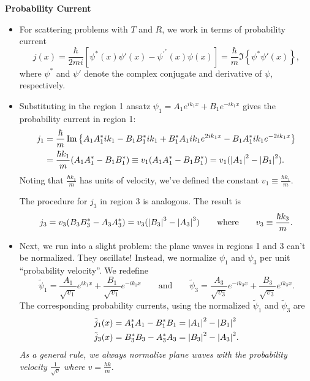 \documentclass[11pt, a4paper]{article}
\newcommand{\eqtext}[1]{\qquad \text{#1} \qquad}
\begin{document}
\textbf{Probability Current} 
\begin{itemize}

	\item For scattering problems with $ T $ and $ R $, we work in terms of probability current
	\begin{equation*}
		j(x) = \frac{\hbar}{2mi}\left[\psi^{*}(x)\psi'(x) - \psi^{'^{*}}(x)\psi(x)\right] = \frac{\hbar}{m} \Im \left\{\psi^{*}\psi'(x)\right\},
	\end{equation*}
	where $ \psi^{*} $ and $ \psi' $ denote the complex conjugate and derivative of $ \psi $, respectively.
	
	\item Substituting in the region 1 ansatz $ \psi_{1} = A_{1} e^{ik_{1}x} + B_{1}e^{-ik_{1}x}  $  gives the probability current in region 1:
	\begin{align*}
		j_{1} &= \frac{\hbar}{m}\Im \left\{A_{1}A_{1}^{*}ik_{1} - B_{1}B_{1}^{*}ik_{1} + B_{1}^{*}A_{1}ik_{1}e^{2ik_{1}x} - B_{1}A_{1}^{*}ik_{1}e^{-2ik_{1}x}\right\}\\
		&=\frac{\hbar k_{1}}{m}(A_{1}A_{1}^{*} - B_{1}B_{1}^{*}) \equiv v_{1}(A_{1}A_{1}^{*} - B_{1}B_{1}^{*}) =  v_{1}(\abs{A_{1}}^{2} - \abs{B_{1}}^{2}).
	\end{align*}
	Noting that $ \frac{\hbar k_{1}}{m} $ has units of velocity, we've defined the constant $ v_{1} \equiv \frac{\hbar k_{1}}{m} $. 
	
	The procedure for $ j_{3} $ in region 3 is analogous. The result is
	\begin{equation*}
		j_{3} = v_{3}(B_{3}B_{3}^{*} - A_{3}A_{3}^{*}) = v_{3}(\abs{B_{3}}^{3} - \abs{A_{3}}^{3}) \eqtext{where} v_{3} \equiv \frac{\hbar k_{3}}{m}.
	\end{equation*}

	
	\item Next, we run into a slight problem: the plane waves in regions 1 and 3 can't be normalized. They oscillate! Instead, we normalize $ \psi_{1} $ and $ \psi_{3} $ per unit ``probability velocity''. We redefine 
	\begin{equation*}
		\tilde{\psi}_{1} = \frac{A_{1}}{\sqrt{v_{1}}} e^{ik_{1}x} + \frac{B_{1}}{\sqrt{v_{1}}}e^{-ik_{1}x} \eqtext{and} \tilde{\psi}_{3} = \frac{A_{3}}{\sqrt{v_{3}}} e^{-ik_{3}x} + \frac{B_{3}}{\sqrt{v_{3}}}e^{ik_{3}x}.
	\end{equation*}
	The corresponding probability currents, using the normalized $ \tilde{\psi}_{1} $ and $ \tilde{\psi}_{3} $ are
	\begin{align*}
		&\tilde{j}_{1}(x) = A_{1}^{*}A_{1} - B_{1}^{*}B_{1} = \abs{A_{1}}^{2} - \abs{B_{1}}^{2}\\
		&\tilde{j}_{3}(x) = B_{3}^{*}B_{3} - A_{3}^{*}A_{3} = \abs{B_{3}}^{2} - \abs{A_{3}}^{2}.
	\end{align*}
	\textit{As a general rule, we always normalize plane waves with the probability velocity $ \frac{1}{\sqrt{v}} $ where $ v = \frac{hk}{m} $}.
	

\end{itemize}
\end{document}
